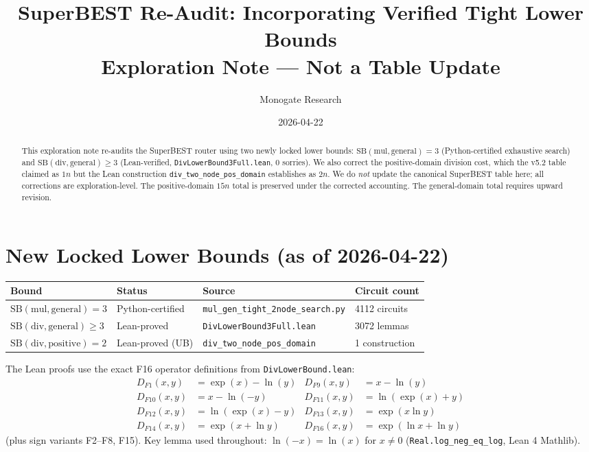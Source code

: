 \documentclass[11pt]{article}
\title{SuperBEST Re-Audit: Incorporating Verified Tight Lower Bounds\\
\large Exploration Note --- Not a Table Update}
\author{Monogate Research}
\date{2026-04-22}
\newcommand{\ok}[1]{\textcolor{correct}{#1}}
\newcommand{\warn}[1]{\textcolor{warn}{#1}}
\begin{document}
\maketitle

\begin{abstract}
This exploration note re-audits the SuperBEST router using two newly locked lower bounds:
$\mathrm{SB}(\mathrm{mul},\mathrm{general}) = 3$ (Python-certified exhaustive search)
and $\mathrm{SB}(\mathrm{div},\mathrm{general}) \geq 3$ (Lean-verified, \texttt{DivLowerBound3Full.lean}, 0 sorries).
We also correct the positive-domain division cost, which the v5.2 table claimed as $1n$ but
the Lean construction \texttt{div\_two\_node\_pos\_domain} establishes as $2n$.
We do \emph{not} update the canonical SuperBEST table here; all corrections are exploration-level.
The positive-domain $15n$ total is \ok{preserved} under the corrected accounting.
The general-domain total requires upward revision.
\end{abstract}

\tableofcontents

\section{New Locked Lower Bounds (as of 2026-04-22)}

\begin{center}
\begin{tabular}{llll}
\toprule
Bound & Status & Source & Circuit count \\
\midrule
$\mathrm{SB}(\mathrm{mul},\text{general}) = 3$ & \warn{Python-certified} & \texttt{mul\_gen\_tight\_2node\_search.py} & 4112 circuits \\
$\mathrm{SB}(\mathrm{div},\text{general}) \geq 3$ & \ok{Lean-proved} & \texttt{DivLowerBound3Full.lean} & 3072 lemmas \\
$\mathrm{SB}(\mathrm{div},\text{positive}) = 2$ & \ok{Lean-proved (UB)} & \texttt{div\_two\_node\_pos\_domain} & 1 construction \\
\bottomrule
\end{tabular}
\end{center}

\noindent The Lean proofs use the exact F16 operator definitions from \texttt{DivLowerBound.lean}:
\begin{align*}
D_{F1}(x,y) &= \exp(x) - \ln(y) & D_{F9}(x,y) &= x - \ln(y) \\
D_{F10}(x,y) &= x - \ln(-y) & D_{F11}(x,y) &= \ln(\exp(x)+y) \\
D_{F12}(x,y) &= \ln(\exp(x)-y) & D_{F13}(x,y) &= \exp(x \ln y) \\
D_{F14}(x,y) &= \exp(x + \ln y) & D_{F16}(x,y) &= \exp(\ln x + \ln y)
\end{align*}
(plus sign variants F2--F8, F15). Key lemma used throughout: $\ln(-x) = \ln(x)$ for $x \neq 0$
(\texttt{Real.log\_neg\_eq\_log}, Lean 4 Mathlib).
\end{document}
